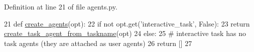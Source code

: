 Definition at line 21 of file agents.\+py.


\begin{DoxyCode}
21 \textcolor{keyword}{def }\hyperlink{namespaceparlai_1_1tasks_1_1wizard__of__wikipedia_1_1agents_a3fb02e79313f0dbce37b5120cc9add1c}{create\_agents}(opt):
22     \textcolor{keywordflow}{if} \textcolor{keywordflow}{not} opt.get(\textcolor{stringliteral}{'interactive\_task'}, \textcolor{keyword}{False}):
23         \textcolor{keywordflow}{return} \hyperlink{namespaceparlai_1_1core_1_1agents_a76269fb567532a8fb7f29edcc20a6e47}{create\_task\_agent\_from\_taskname}(opt)
24     \textcolor{keywordflow}{else}:
25         \textcolor{comment}{# interactive task has no task agents (they are attached as user agents)}
26         \textcolor{keywordflow}{return} []
27 \end{DoxyCode}
